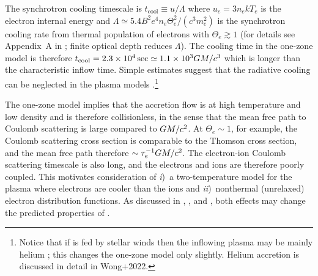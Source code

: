 The synchrotron cooling timescale is $t_\mathrm{cool} \equiv u/\Lambda$ where $u_e = 3 n_e k T_e$ is the electron internal energy and $\Lambda \simeq 5.4 B^2 e^4 n_e \Theta_e^2 /(c^3 m_e^2)$ is the synchrotron cooling rate from thermal population of electrons with $\Theta_e \gtrsim 1$ (for details see Appendix~A in \citealt{2011ApJ...735....9M}; finite optical depth reduces $\Lambda$).
The cooling time in the one-zone model is therefore $t_\mathrm{cool}=2.3 \times 10^4\,\mathrm{sec} \simeq 1.1 \times 10^3 GM/c^3$ which is longer than the characteristic inflow time.
Simple estimates suggest that the radiative cooling can be neglected in the plasma models \citep[more detailed calculations confirm this estimate][]{2012MNRAS.426.1928D}.\footnote{Notice that if \sgra is fed by stellar winds then the inflowing plasma may be mainly helium \citep{2019MNRAS.482L.123R}; this changes the one-zone model only slightly. Helium accretion is discussed in detail in Wong+2022.}

The one-zone model implies that the accretion flow is at high temperature and low density and is therefore collisionless, in the sense that the mean free path to Coulomb scattering is large compared to $GM/c^2$.
At $\Theta_e \sim 1$, for example, the Coulomb scattering cross section is comparable to the Thomson cross section, and the mean free path therefore $\sim \tau_e^{-1} GM/c^2$.
The electron-ion Coulomb scattering timescale is also long, and the electrons and ions are therefore poorly coupled.
This motivates consideration of
\emph{i})~a two-temperature model for the plasma where electrons are cooler than the ions \citep{1976ApJ...204..187S,1977ApJ...214..840I, 1982Natur.295...17R} and
\emph{ii})~nonthermal (unrelaxed) electron distribution functions.
As discussed in \citet{2000ApJ...541..234O}, \citet{2009ApJ...701..521C}, and \citet{2014A&A...570A...7M} \citep[see also more recent work by][]{2018A&A...612A..34D,2021arXiv211102518F, 2021NatAs.tmp..218C, 2021arXiv211203933E}, both effects may change the predicted properties of \sgra.

